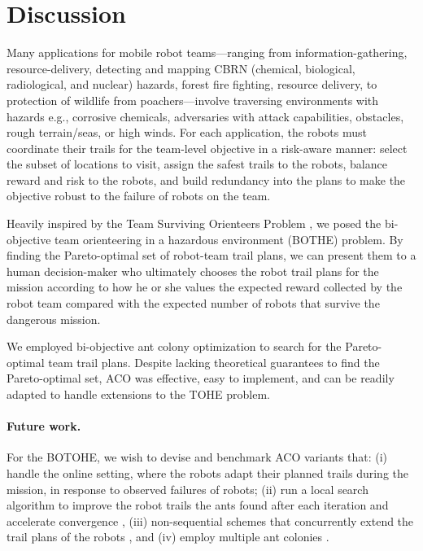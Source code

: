 \documentclass[fleqn,10pt,lineno]{wlpeerj}
\begin{document}
 
 




\section{Discussion}
Many applications for mobile robot teams---ranging from information-gathering, resource-delivery, detecting and mapping CBRN (chemical, biological, radiological, and nuclear) hazards, forest fire fighting, resource delivery, to protection of wildlife from poachers---involve traversing environments with hazards e.g., corrosive chemicals, adversaries with attack capabilities, obstacles, rough terrain/seas, or high winds. 
For each application, the robots must coordinate their trails for the team-level objective in a risk-aware manner: select the subset of locations to visit, assign the safest trails to the robots, balance reward and risk to the robots, and build redundancy into the plans to make the objective robust to the failure of robots on the team. 

Heavily inspired by the Team Surviving Orienteers Problem \cite{jorgensen2018team,jorgensen2017matroid,jorgensen2024matroid}, we posed the bi-objective team orienteering in a hazardous environment (BOTHE) problem. 
By finding the Pareto-optimal set of robot-team trail plans, we can present them to a human decision-maker who ultimately chooses the robot trail plans for the mission according to how he or she values the expected reward collected by the robot team compared with the expected number of robots that survive the dangerous mission.

We employed bi-objective ant colony optimization to search for the Pareto-optimal team trail plans. Despite lacking theoretical guarantees to find the Pareto-optimal set, ACO was effective, easy to implement, and can be readily adapted to handle extensions to the TOHE problem.

\paragraph{Future work.}
For the BOTOHE, we wish to devise and benchmark ACO variants that:
(i) handle the online setting, where the robots adapt their planned trails during the mission, in response to observed failures of robots; 
(ii) run a local search algorithm to improve the robot trails the ants found after each iteration and accelerate convergence \cite{dorigo2006ant}, 
(iii) non-sequential schemes that concurrently extend the trail plans of the robots \cite{ke2008ants}, and 
(iv) employ multiple ant colonies \cite{iredi2001bi}.
\end{document}
